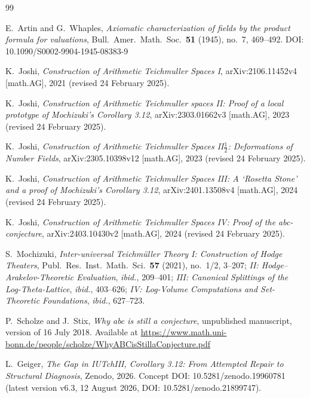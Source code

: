 \documentclass[11pt,a4paper]{article}
\theoremstyle{definition}
\theoremstyle{remark}
\begin{document}
\begin{thebibliography}{99}
\raggedright

E.~Artin and G.~Whaples,
\emph{Axiomatic characterization of fields by the product formula for
valuations},
Bull.\ Amer.\ Math.\ Soc.\ \textbf{51} (1945), no.~7, 469--492.
DOI: 10.1090/S0002-9904-1945-08383-9

K.~Joshi,
\emph{Construction of Arithmetic Teichmuller Spaces I},
arXiv:2106.11452v4 [math.AG], 2021 (revised 24 February 2025).

K.~Joshi,
\emph{Construction of Arithmetic Teichmuller spaces II: Proof of a local
prototype of Mochizuki's Corollary 3.12},
arXiv:2303.01662v3 [math.AG], 2023 (revised 24 February 2025).

K.~Joshi,
\emph{Construction of Arithmetic Teichmuller Spaces II$\frac{1}{2}$:
Deformations of Number Fields},
arXiv:2305.10398v12 [math.AG], 2023 (revised 24 February 2025).

K.~Joshi,
\emph{Construction of Arithmetic Teichmuller Spaces III: A `Rosetta Stone'
and a proof of Mochizuki's Corollary 3.12},
arXiv:2401.13508v4 [math.AG], 2024 (revised 24 February 2025).

K.~Joshi,
\emph{Construction of Arithmetic Teichmuller Spaces IV: Proof of the
abc-conjecture},
arXiv:2403.10430v2 [math.AG], 2024 (revised 24 February 2025).

S.~Mochizuki,
\emph{Inter-universal Teichm\"{u}ller Theory I: Construction of Hodge
Theaters}, Publ.\ Res.\ Inst.\ Math.\ Sci.\ \textbf{57} (2021), no.~1/2,
3--207;
\emph{II: Hodge--Arakelov-Theoretic Evaluation}, \emph{ibid.}, 209--401;
\emph{III: Canonical Splittings of the Log-Theta-Lattice}, \emph{ibid.}, 403--626;
\emph{IV: Log-Volume Computations and Set-Theoretic Foundations},
\emph{ibid.}, 627--723.

P.~Scholze and J.~Stix,
\emph{Why abc is still a conjecture},
unpublished manuscript, version of 16 July 2018.
Available at
\url{https://www.math.uni-bonn.de/people/scholze/WhyABCisStillaConjecture.pdf}

L.~Geiger,
\emph{The Gap in IUTchIII, Corollary 3.12: From Attempted Repair to
Structural Diagnosis},
Zenodo, 2026.
Concept DOI: 10.5281/zenodo.19960781
(latest version v6.3, 12 August 2026, DOI: 10.5281/zenodo.21899747).


\end{thebibliography}
\end{document}
